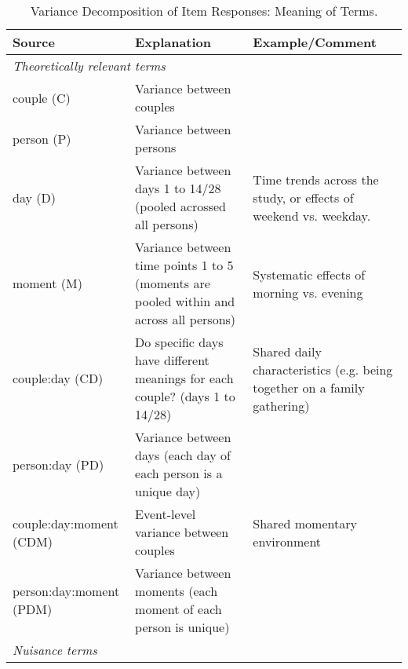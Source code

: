 \documentclass[jou,a4paper,draftfirst]{apa6}\usepackage[]{graphicx}\usepackage[]{color}
\begin{document}
\begin{table*}
	\begin{threeparttable}
		\scriptsize
		\caption{Variance Decomposition of Item Responses: Meaning of Terms.}
		\label{tab:varDecompExplanation}
		\begin{tabularx}{\textwidth}{lXX}
			\toprule			
			Source & Explanation & Example/Comment\\    
			
			\midrule			   
 \multicolumn{3}{l}{\emph{Theoretically relevant terms}}\\ 
 
 couple (C) & Variance between couples &  \\ 
  person (P) & Variance between persons &  \\ 
  day (D) & Variance between days 1 to 14/28 (pooled acrossed all persons) & Time trends across the study, or effects of weekend vs. weekday. \\ 
  moment (M) & Variance between time points 1 to 5 (moments are pooled within and across all persons) & Systematic effects of morning vs. evening \\ 
  couple:day (CD) & Do specific days have different meanings for each couple? (days 1 to 14/28) & Shared daily characteristics (e.g. being together on a family gathering) \\ 
  person:day (PD) & Variance between days (each day of each person is a unique day) &  \\ 
  couple:day:moment (CDM) & Event-level variance between couples & Shared momentary environment \\ 
  person:day:moment (PDM) & Variance between moments (each moment of each person is unique) &  \\ 
  

\midrule	

 \multicolumn{3}{l}{\emph{Nuisance terms}}\\ 
 

\end{tabularx}
\end{threeparttable}
\end{table*}
\end{document}
